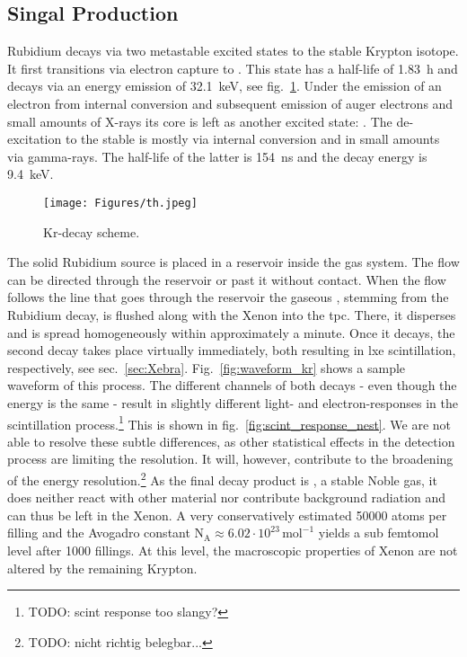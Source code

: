 
\FloatBarrier
\subsection{ Singal Production}
\label{ssec:source}
\FloatBarrier


Rubidium  decays via two metastable excited states to the stable  Krypton isotope.
It first transitions via electron capture to .
This state has a half-life of \SI{1.83}{\hour} and decays via an energy emission of \SI{32.1}{\kilo\electronvolt}, see fig.~\ref{fig:scheme_kr}.
Under the emission of an electron from internal conversion and subsequent emission of auger electrons and small amounts of X-rays its core is left as another excited state: .
The de-excitation to the stable  is mostly via internal conversion and in small amounts via gamma-rays.
The half-life of the latter is \SI{154}{\nano\s} and the decay energy is \SI{9.4}{\kilo\electronvolt}.


\begin{figure}
    \centering
    \texttt{[image: Figures/th.jpeg]}  %
    \caption[Decay Scheme Krypton]{
        Kr-decay scheme\cite{kr_scheme}.
    }
    \label{fig:scheme_kr}
\end{figure}

The solid Rubidium source is placed in a reservoir inside the gas system.
The flow can be directed through the reservoir or past it without contact.
When the flow follows the line that goes through the reservoir the gaseous , stemming from the Rubidium decay, is flushed along with the Xenon into the \gls{tpc}.
There, it disperses and is spread homogeneously within approximately a minute.
Once it decays, the second decay takes place virtually immediately, both resulting in \gls{lxe} scintillation, respectively, see sec.~\ref{sec:Xebra}.
Fig.~\ref{fig:waveform_kr} shows a sample waveform of this process.
The different channels of both decays - even though the energy is the same - result in slightly different light- and electron-responses in the scintillation process.\footnote{TODO: scint response too slangy?}
This is shown in fig.~\ref{fig:scint_response_nest}.
We are not able to resolve these subtle differences, as other statistical effects in the detection process are limiting the resolution.
It will, however, contribute to the broadening of the energy resolution.\footnote{TODO: nicht richtig belegbar...}
As the final decay product is , a stable Noble gas, it does neither react with other material nor contribute background radiation and can thus be left in the Xenon.
A very conservatively estimated \SI{50000}{} atoms per filling and the Avogadro constant $ \mathrm{N}_\mathrm{A} \approx 6.02\cdot10^{23}\,\mathrm{mol}^{-1} $ yields a sub femtomol level after 1000 fillings.
At this level, the macroscopic properties of Xenon are not altered by the remaining Krypton.


